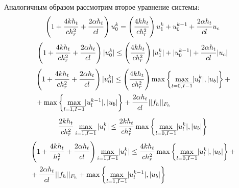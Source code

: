 \documentclass[a4paper,12pt,russian, fleqn]{extreport}
\begin{document}
	Аналогичным образом рассмотрим второе уравнение системы:
	\begin{align}
		\left( 1 + \dfrac{\strut 4kh_t}{\strut ch_r^2} + \dfrac{\strut 2\alpha h_t}{\strut cl} \right)u_0^k = \left(\dfrac{\strut 4kh_t}{\strut ch_r^2}\right)u_1^{k} + u_0^{k-1} + \dfrac{\strut 2\alpha h_t}{\strut cl}u_c \nonumber
	\end{align}
	\begin{align}
		\left( 1 + \dfrac{\strut 4kh_t}{\strut ch_r^2} + \dfrac{\strut 2\alpha h_t}{\strut cl} \right)\lvert u_0^k \rvert \leq \left(\dfrac{\strut 4kh_t}{\strut ch_r^2}\right) \lvert u_1^{k} \rvert + \lvert u_0^{k-1} \rvert + \dfrac{\strut 2\alpha h_t}{\strut cl} \lvert u_c \rvert \nonumber
	\end{align}
	\begin{align}\label{StabilitySecond}
		& \left( 1 + \dfrac{\strut 4kh_t}{\strut ch_r^2} + \dfrac{\strut 2\alpha h_t}{\strut cl} \right)\lvert u_0^k \rvert \leq \left(\dfrac{\strut 4kh_t}{\strut ch_r^2}\right) \max\left\{\max\limits_{l = \overline{0, I-1}}\lvert u_l^k \rvert, \lvert u_b \rvert \right\} + \nonumber \\
		& + \max\left\{\max\limits_{l = \overline{1, I-1}}\lvert u_l^{k-1} \rvert, \lvert u_b \rvert \right\} + \dfrac{\strut 2\alpha h_t}{\strut cl} \lvert\lvert f_h \rvert\rvert_{F_h}
	\end{align}
	\begin{align}
		\dfrac{\strut 2kh_t}{\strut ch_r^2}\max\limits_{i = \overline{1, I-1}} \vert u_i^k \vert \leq \dfrac{\strut 2kh_t}{ch_r^2} \max{\left\{ \max\limits_{l = \overline{0, I-1}} \lvert u_l^k \rvert, \lvert u_b \rvert \right\}} \nonumber
	\end{align}
	\begin{align}\label{StabilityFirst}
		& \left(  1 + \dfrac{\strut 4 k h_t}{\strut h_r^2} + \dfrac{\strut 2 \alpha h_t}{\strut cl} \right) \max\limits_{i=\overline{1, I-1}} \lvert u^k_i \rvert \leq \dfrac{\strut 4 k h_t}{\strut ch_r^2} \max\left\{\max\limits_{l = \overline{0, I-1}}\lvert u_l^k \rvert, \lvert u_b \rvert \right\} + \nonumber \\ 
		& + \dfrac{\strut 2\alpha h_t}{\strut cl}\lvert \lvert f_h \rvert\rvert_{F_h} + \max\left\{\max\limits_{l = \overline{1, I-1}}\lvert u_l^{k-1} \rvert, \lvert u_b \rvert \right\}
	\end{align}
	
\end{document}
